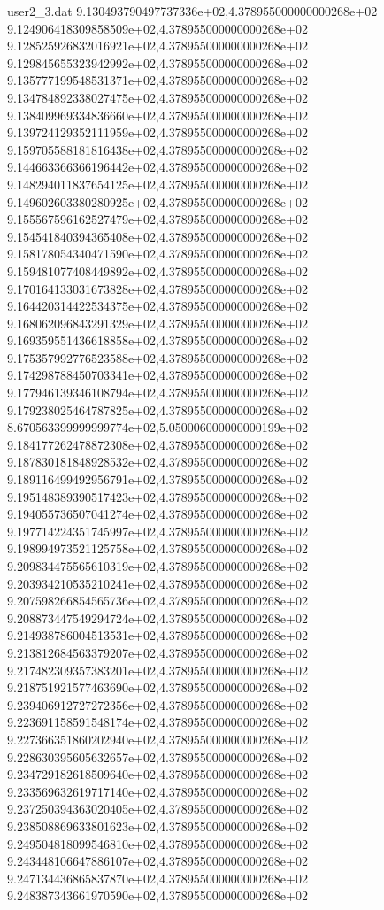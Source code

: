\begin{filecontents}{user2_3.dat}
9.130493790497737336e+02,4.378955000000000268e+02
9.124906418309858509e+02,4.378955000000000268e+02
9.128525926832016921e+02,4.378955000000000268e+02
9.129845655323942992e+02,4.378955000000000268e+02
9.135777199548531371e+02,4.378955000000000268e+02
9.134784892338027475e+02,4.378955000000000268e+02
9.138409969334836660e+02,4.378955000000000268e+02
9.139724129352111959e+02,4.378955000000000268e+02
9.159705588181816438e+02,4.378955000000000268e+02
9.144663366366196442e+02,4.378955000000000268e+02
9.148294011837654125e+02,4.378955000000000268e+02
9.149602603380280925e+02,4.378955000000000268e+02
9.155567596162527479e+02,4.378955000000000268e+02
9.154541840394365408e+02,4.378955000000000268e+02
9.158178054340471590e+02,4.378955000000000268e+02
9.159481077408449892e+02,4.378955000000000268e+02
9.170164133031673828e+02,4.378955000000000268e+02
9.164420314422534375e+02,4.378955000000000268e+02
9.168062096843291329e+02,4.378955000000000268e+02
9.169359551436618858e+02,4.378955000000000268e+02
9.175357992776523588e+02,4.378955000000000268e+02
9.174298788450703341e+02,4.378955000000000268e+02
9.177946139346108794e+02,4.378955000000000268e+02
9.179238025464787825e+02,4.378955000000000268e+02
8.670563399999999774e+02,5.050006000000000199e+02
9.184177262478872308e+02,4.378955000000000268e+02
9.187830181848928532e+02,4.378955000000000268e+02
9.189116499492956791e+02,4.378955000000000268e+02
9.195148389390517423e+02,4.378955000000000268e+02
9.194055736507041274e+02,4.378955000000000268e+02
9.197714224351745997e+02,4.378955000000000268e+02
9.198994973521125758e+02,4.378955000000000268e+02
9.209834475565610319e+02,4.378955000000000268e+02
9.203934210535210241e+02,4.378955000000000268e+02
9.207598266854565736e+02,4.378955000000000268e+02
9.208873447549294724e+02,4.378955000000000268e+02
9.214938786004513531e+02,4.378955000000000268e+02
9.213812684563379207e+02,4.378955000000000268e+02
9.217482309357383201e+02,4.378955000000000268e+02
9.218751921577463690e+02,4.378955000000000268e+02
9.239406912727272356e+02,4.378955000000000268e+02
9.223691158591548174e+02,4.378955000000000268e+02
9.227366351860202940e+02,4.378955000000000268e+02
9.228630395605632657e+02,4.378955000000000268e+02
9.234729182618509640e+02,4.378955000000000268e+02
9.233569632619717140e+02,4.378955000000000268e+02
9.237250394363020405e+02,4.378955000000000268e+02
9.238508869633801623e+02,4.378955000000000268e+02
9.249504818099546810e+02,4.378955000000000268e+02
9.243448106647886107e+02,4.378955000000000268e+02
9.247134436865837870e+02,4.378955000000000268e+02
9.248387343661970590e+02,4.378955000000000268e+02

\end{filecontents}
